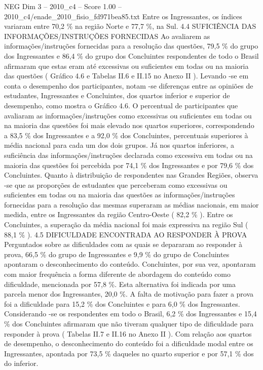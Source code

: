 \begin{textsample}{NEG Dim 3 – 2010\_c4 – Score 1.00 – 2010\_c4/enade\_2010\_fisio\_fd971bea85.txt}
Entre os Ingressantes, os índices variaram entre 70,2 \% na região Norte e 77,7 \%, na Sul. 4.4 SUFICIÊNCIA DAS INFORMAÇÕES/INSTRUÇÕES FORNECIDAS Ao avaliarem as informações/instruções fornecidas para a resolução das questões, 79,5 \% do grupo dos Ingressantes e 86,4 \% do grupo dos Concluintes respondentes de todo o Brasil afirmaram que estas eram até excessivas ou suficientes em todas ou na maioria das questões ( Gráfico 4.6 e Tabelas II.6 e II.15 no Anexo II ).
Levando -se em conta o desempenho dos participantes, notam -se diferenças entre as opiniões de estudantes, Ingressantes e Concluintes, dos quartos inferior e superior de desempenho, como mostra o Gráfico 4.6.
O percentual de participantes que avaliaram as informações/instruções como excessivas ou suficientes em todas ou na maioria das questões foi mais elevado nos quartos superiores, correspondendo a 83,5 \% dos Ingressantes e a 92,0 \% dos Concluintes, percentuais superiores à média nacional para cada um dos dois grupos.
Já nos quartos inferiores, a suficiência das informações/instruções declarada como excessiva em todas ou na maioria das questões foi percebida por 74,1 \% dos Ingressantes e por 79,6 \% dos Concluintes.
Quanto à distribuição de respondentes nas Grandes Regiões, observa -se que as proporções de estudantes que perceberam como excessivas ou suficientes em todas ou na maioria das questões as informações/instruções fornecidas para a resolução das mesmas superaram as médias nacionais, em maior medida, entre os Ingressantes da região Centro-Oeste ( 82,2 \% ).
Entre os Concluintes, a superação da média nacional foi mais expressiva na região Sul ( 88,1 \% ). 4.5 DIFICULDADE ENCONTRADA AO RESPONDER À PROVA Perguntados sobre as dificuldades com as quais se depararam ao responder à prova, 66,5 \% do grupo de Ingressantes e 9,9 \% do grupo de Concluintes apontaram o desconhecimento do conteúdo.
Concluintes, por sua vez, apontaram com maior frequência a forma diferente de abordagem do conteúdo como dificuldade, mencionada por 57,8 \%.
Esta alternativa foi indicada por uma parcela menor dos Ingressantes, 20,0 \%.
A falta de motivação para fazer a prova foi a dificuldade para 15,2 \% dos Concluintes e para 6,0 \% dos Ingressantes.
Considerando -se os respondentes em todo o Brasil, 6,2 \% dos Ingressantes e 15,4 \% dos Concluintes afirmaram que não tiveram qualquer tipo de dificuldade para responder à prova ( Tabelas II.7 e II.16 no Anexo II ).
Com relação aos quartos de desempenho, o desconhecimento do conteúdo foi a dificuldade modal entre os Ingressantes, apontada por 73,5 \% daqueles no quarto superior e por 57,1 \% dos do inferior.

\end{textsample}
